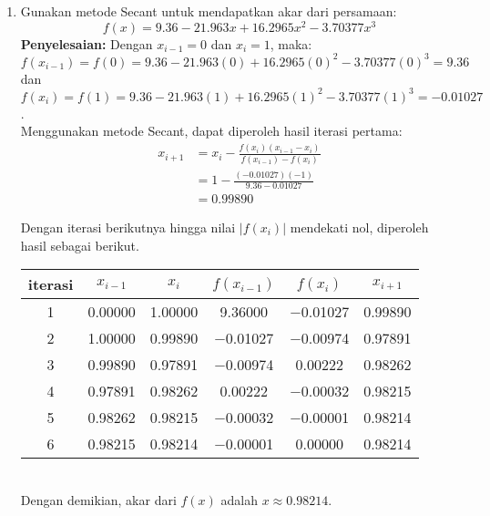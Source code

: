 \documentclass{article}
\newcommand{\penyelesaian}{\textbf{Penyelesaian: }}
\begin{document}
\begin{enumerate}
    \item Gunakan metode Secant untuk mendapatkan akar dari persamaan:
    \begin{equation*}
        f(x) = \num{9,36} - \num{21,963}x + \num{16,2965}x^2 - \num{3,70377}x^3
    \end{equation*}
    \penyelesaian Dengan $x_{i-1} = 0$ dan $x_i = 1$, maka: \\
    $f(x_{i-1}) = f(0) = \num{9,36} - \num{21,963}(0) + \num{16,2965}(0)^2 - \num{3,70377}(0)^3 = \num{9,36}$ dan \\ 
    $f(x_{i}) = f(1) = \num{9,36} - \num{21,963}(1) + \num{16,2965}(1)^2 - \num{3,70377}(1)^3 = \num{-0,01027}$. \\

    Menggunakan metode Secant, dapat diperoleh hasil iterasi pertama:
    \begin{align*}
        x_{i+1} &= x_i - \frac{f(x_i)(x_{i-1} - x_i)}{f(x_{i-1}) - f(x_i)} \\
        &= 1 - \frac{(-\num{0,01027})(-1)}{\num{9,36} - \num{0,01027}} \\
        &= \num{0,99890}
    \end{align*}

    Dengan iterasi berikutnya hingga nilai $|f(x_i)|$ mendekati nol, diperoleh hasil sebagai berikut.\\
    \begin{tabular}{|c|c|c|c|c|c|}
        \hline
        iterasi & $x_{i-1}$ & $x_i$ & $f(x_{i-1})$ & $f(x_i)$ & $x_{i+1}$ \\
        \hline
        1 & \num{0,00000} & \num{1,00000} & \num{9,36000} & \num{-0,01027} & \num{0,99890}\\
        2 & \num{1,00000} & \num{0,99890} & \num{-0,01027} & \num{-0,00974} & \num{0,97891}\\
        3 & \num{0,99890} & \num{0,97891} & \num{-0,00974} & \num{0,00222} & \num{0,98262}\\
        4 & \num{0,97891} & \num{0,98262} & \num{0,00222} & \num{-0,00032} & \num{0,98215}\\
        5 & \num{0,98262} & \num{0,98215} & \num{-0,00032} & \num{-0,00001} & \num{0,98214}\\
        6 & \num{0,98215} & \num{0,98214} & \num{-0,00001} & \num{0,00000} & \num{0,98214}\\
         \hline
        \end{tabular} \\
    Dengan demikian, akar dari $f(x)$ adalah $x \approx \num{0,98214}$.


\end{enumerate}
\end{document}
